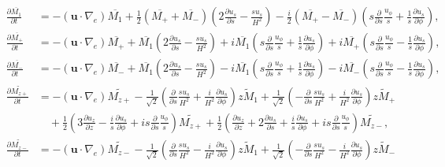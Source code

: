 \begin{align*}
    \frac{\partial \overline{M_1}}{\partial t} &= - \left(\mathbf{u}\cdot \nabla_e \right) \overline{M_1} + \frac{1}{2} \left(\overline{M_+} + \overline{M_-}\right) \left(2\frac{\partial u_s}{\partial s} - \frac{su_s}{H^2}\right) - \frac{i}{2} \left(\overline{M_+} - \overline{M_-}\right) \left(s \frac{\partial}{\partial s}\frac{u_\phi}{s} + \frac{1}{s}\frac{\partial u_s}{\partial \phi}\right), \\
    \frac{\partial \overline{M_+}}{\partial t} &= - \left(\mathbf{u}\cdot \nabla_e \right) \overline{M_+} + \overline{M_1} \left(2\frac{\partial u_s}{\partial s} - \frac{su_s}{H^2}\right) + i\overline{M_1} \left(s \frac{\partial}{\partial s}\frac{u_\phi}{s} + \frac{1}{s}\frac{\partial u_s}{\partial \phi}\right) + i \overline{M_+} \left(s \frac{\partial}{\partial s}\frac{u_\phi}{s} - \frac{1}{s}\frac{\partial u_s}{\partial \phi}\right), \\ 
    \frac{\partial \overline{M_-}}{\partial t} &= - \left(\mathbf{u}\cdot \nabla_e \right) \overline{M_-} + \overline{M_1} \left(2\frac{\partial u_s}{\partial s} - \frac{su_s}{H^2}\right) - i\overline{M_1} \left(s \frac{\partial}{\partial s}\frac{u_\phi}{s} + \frac{1}{s}\frac{\partial u_s}{\partial \phi}\right) - i \overline{M_-} \left(s \frac{\partial}{\partial s}\frac{u_\phi}{s} - \frac{1}{s}\frac{\partial u_s}{\partial \phi}\right), \\ 
    \frac{\partial \widetilde{M_{z+}}}{\partial t} &= - (\mathbf{u}\cdot \nabla_e) \widetilde{M_{z+}} -\frac{1}{\sqrt{2}} \left(\frac{\partial}{\partial s} \frac{su_s}{H^2} + \frac{i}{H^2} \frac{\partial u_s}{\partial \phi}\right) \widetilde{zM_1} + \frac{1}{\sqrt{2}} \left(-\frac{\partial}{\partial s}\frac{su_s}{H^2} + \frac{i}{H^2}\frac{\partial u_s}{\partial \phi}\right) \widetilde{zM_+} \\ 
    &\quad + \frac{1}{2}\left(3 \frac{\partial u_z}{\partial z} - \frac{i}{s}\frac{\partial u_s}{\partial \phi} + is \frac{\partial}{\partial s}\frac{u_\phi}{s}\right) \widetilde{M_{z+}}
    + \frac{1}{2} \left(\frac{\partial u_z}{\partial z} + 2 \frac{\partial u_s}{\partial s} + \frac{i}{s} \frac{\partial u_s}{\partial \phi} + is \frac{\partial}{\partial s}\frac{u_\phi}{s}\right) \widetilde{M_{z-}}, \\
    \frac{\partial \widetilde{M_{z-}}}{\partial t} &= - (\mathbf{u}\cdot \nabla_e) \widetilde{M_{z-}} -\frac{1}{\sqrt{2}} \left(\frac{\partial}{\partial s} \frac{su_s}{H^2} - \frac{i}{H^2} \frac{\partial u_s}{\partial \phi}\right) \widetilde{zM_1} + \frac{1}{\sqrt{2}} \left(-\frac{\partial}{\partial s}\frac{su_s}{H^2} - \frac{i}{H^2}\frac{\partial u_s}{\partial \phi}\right) \widetilde{zM_-} \\

\end{align*}
